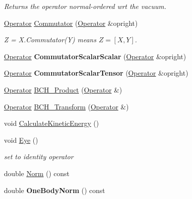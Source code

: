 \begin{DoxyCompactItemize}
\begin{DoxyCompactList}\small\item\em Returns the operator normal-\/ordered wrt the vacuum. \end{DoxyCompactList}\item 
\hypertarget{classOperator_a9d78ca5fd265cf4ccc6cda81d35cb086}{\hyperlink{classOperator}{Operator} \hyperlink{classOperator_a9d78ca5fd265cf4ccc6cda81d35cb086}{Commutator} (\hyperlink{classOperator}{Operator} \&opright)}\label{classOperator_a9d78ca5fd265cf4ccc6cda81d35cb086}

\begin{DoxyCompactList}\small\item\em Z = X.\-Commutator(\-Y) means $ Z = [X,Y] $. \end{DoxyCompactList}\item 
\hypertarget{classOperator_a55b95477ad8674877eb4d15491cfe9a0}{\hyperlink{classOperator}{Operator} {\bfseries Commutator\-Scalar\-Scalar} (\hyperlink{classOperator}{Operator} \&opright)}\label{classOperator_a55b95477ad8674877eb4d15491cfe9a0}

\item 
\hypertarget{classOperator_a7db0372f91cffc85b293f7750c72944a}{\hyperlink{classOperator}{Operator} {\bfseries Commutator\-Scalar\-Tensor} (\hyperlink{classOperator}{Operator} \&opright)}\label{classOperator_a7db0372f91cffc85b293f7750c72944a}

\item 
\hyperlink{classOperator}{Operator} \hyperlink{classOperator_a6a91cd02db723ee28b7532e6af029033}{B\-C\-H\-\_\-\-Product} (\hyperlink{classOperator}{Operator} \&)
\item 
\hyperlink{classOperator}{Operator} \hyperlink{classOperator_adc5537604f6b71121163370aca79dfef}{B\-C\-H\-\_\-\-Transform} (\hyperlink{classOperator}{Operator} \&)
\item 
void \hyperlink{classOperator_a701c64f8be794e89fd28a643b56d534a}{Calculate\-Kinetic\-Energy} ()
\item 
\hypertarget{classOperator_a03a378f0da2fe71d8160bd3262891457}{void \hyperlink{classOperator_a03a378f0da2fe71d8160bd3262891457}{Eye} ()}\label{classOperator_a03a378f0da2fe71d8160bd3262891457}

\begin{DoxyCompactList}\small\item\em set to identity operator \end{DoxyCompactList}\item 
double \hyperlink{classOperator_acb9d7959232a636191b91f6bf5b7b0c8}{Norm} () const 
\item 
\hypertarget{classOperator_a72dc7aea85c7775097d235de6f17f330}{double {\bfseries One\-Body\-Norm} () const }\label{classOperator_a72dc7aea85c7775097d235de6f17f330}


\end{DoxyCompactItemize}
